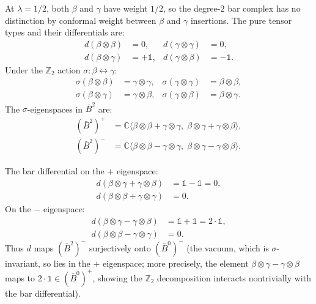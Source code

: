 \begin{computation}[Degree-2 bar differential at \texorpdfstring{$\lambda = 1/2$}{lambda = 1/2}]
\label{comp:symplectic-degree2}
At $\lambda = 1/2$, both $\beta$ and $\gamma$ have weight $1/2$,
so the degree-$2$ bar complex has no distinction by conformal
weight between $\beta$ and $\gamma$ insertions.  The pure tensor
types and their differentials are:
\begin{align*}
d(\beta \otimes \beta) &= 0, &
d(\gamma \otimes \gamma) &= 0, \\
d(\beta \otimes \gamma) &= +\mathbb{1}, &
d(\gamma \otimes \beta) &= -\mathbb{1}.
\end{align*}
Under the $\mathbb{Z}_2$ action $\sigma: \beta \leftrightarrow \gamma$:
\begin{align*}
\sigma(\beta \otimes \beta) &= \gamma \otimes \gamma, &
\sigma(\gamma \otimes \gamma) &= \beta \otimes \beta, \\
\sigma(\beta \otimes \gamma) &= \gamma \otimes \beta, &
\sigma(\gamma \otimes \beta) &= \beta \otimes \gamma.
\end{align*}
The $\sigma$-eigenspaces in $\bar{B}^2$ are:
\begin{align}
(\bar{B}^2)^+ &= \mathbb{C}\langle
\beta \otimes \beta + \gamma \otimes \gamma, \;
\beta \otimes \gamma + \gamma \otimes \beta \rangle,
\label{eq:Bplus-deg2} \\
(\bar{B}^2)^- &= \mathbb{C}\langle
\beta \otimes \beta - \gamma \otimes \gamma, \;
\beta \otimes \gamma - \gamma \otimes \beta \rangle.
\label{eq:Bminus-deg2}
\end{align}

The bar differential on the $+$ eigenspace:
\begin{align*}
d(\beta \otimes \gamma + \gamma \otimes \beta)
&= \mathbb{1} - \mathbb{1} = 0, \\
d(\beta \otimes \beta + \gamma \otimes \gamma) &= 0.
\end{align*}
On the $-$ eigenspace:
\begin{align*}
d(\beta \otimes \gamma - \gamma \otimes \beta)
&= \mathbb{1} + \mathbb{1} = 2 \cdot \mathbb{1}, \\
d(\beta \otimes \beta - \gamma \otimes \gamma) &= 0.
\end{align*}
Thus $d$ maps $(\bar{B}^2)^-$ surjectively onto $(\bar{B}^0)^-$
(the vacuum, which is $\sigma$-invariant, so lies in the $+$
eigenspace; more precisely, the element
$\beta \otimes \gamma - \gamma \otimes \beta$ maps to
$2 \cdot \mathbb{1} \in (\bar{B}^0)^+$, showing the $\mathbb{Z}_2$
decomposition interacts nontrivially with the bar differential).
\end{computation}

